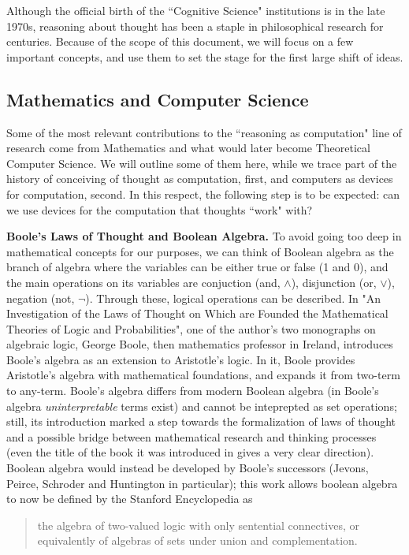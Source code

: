 \documentclass[../main.tex]{subfiles}
\begin{document}
Although the official birth of the ``Cognitive Science" institutions is in the late 1970s, reasoning about thought has been a staple in philosophical research for centuries. Because of the scope of this document, we will focus on a few important concepts, and use them to set the stage for the first large shift of ideas.

\subsection{Mathematics and Computer Science}
Some of the most relevant contributions to the ``reasoning as computation" line of research come from Mathematics and what would later become Theoretical Computer Science. We will outline some of them here, while we trace part of the history of conceiving of thought as computation, first, and computers as devices for computation, second. In this respect, the following step is to be expected: can we use devices for the computation that thoughts ``work" with?


\vspace{4pt}
\textbf{Boole's Laws of Thought and Boolean Algebra.}
To avoid going too deep in mathematical concepts for our purposes, we can think of Boolean algebra as the branch of algebra where the variables can be either true or false (1 and 0), and the main operations on its variables are conjuction (and, $\wedge$), disjunction (or, $\vee$), negation (not, $\neg$). Through these, logical operations can be described.
In "An Investigation of the Laws of Thought on Which are Founded the Mathematical Theories of Logic and Probabilities", one of the author's two monographs on algebraic logic, George Boole, then mathematics professor in Ireland, introduces Boole's algebra as an extension to Aristotle's logic. In it, Boole provides Aristotle's algebra with mathematical foundations, and expands it from two-term to any-term. Boole's algebra differs from modern Boolean algebra (in Boole's algebra \textit{uninterpretable} terms exist) and cannot be inteprepted as set operations; still, its introduction marked a step towards the formalization of laws of thought and a possible bridge between mathematical research and thinking processes (even the title of the book it was introduced in gives a very clear direction). Boolean algebra would instead be developed by Boole's successors (Jevons, Peirce, Schroder and Huntington in particular); this work allows boolean algebra to now be defined by the Stanford Encyclopedia as
\begin{quote}
    the algebra of two-valued logic with only sentential connectives, or equivalently of algebras of sets under union and complementation.
\end{quote}
\end{document}
